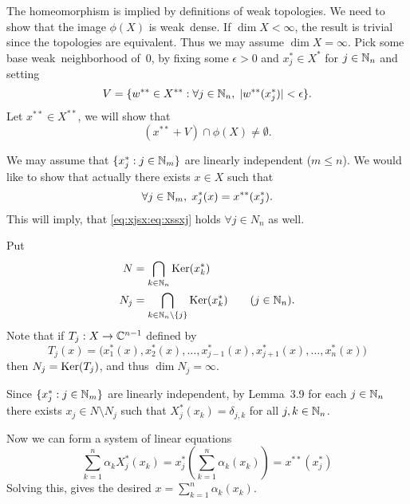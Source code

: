 \begin{enumerate}
\begin{itemize}
The homeomorphism is implied by definitions of weak topologies.
We need to show that the image \(\phi(X)\) is weak\upstar\ dense.
If \(\dim X < \infty\),
 the result is trivial since the topologies are equivalent.
Thus we may assume \(\dim X = \infty\).
Pick some base weak\upstar\ neighborhood of~0,
by fixing some \(\epsilon>0\) and \(x_j^*\in X^*\) for \(j\in\mathbb{N}_n\) and
setting
\begin{equation*}
V = \{w^{**}\in X^{**}: \forall j\in\mathbb{N}_n,\; |w^{**}(x_j^*)| < \epsilon\}.
\end{equation*}
Let \(x^{**}\in X^{**}\), we will show that
\begin{equation*}
(x^{**} + V) \cap \phi(X) \neq \emptyset.
\end{equation*}
\iffalse
We may assume that \(\{x_j^*:j\in\N_n\}\) are linearly independent,
since otherwise, we can take a linearly independent subset,
and the rest of the evaluations will be determined.
\fi
We may assume that \(\{x_j^*:j\in\mathbb{N}_m\}\) are linearly independent (\(m\leq n\)).
We would like to show that actually there exists \(x\in X\) such that
\begin{equation} \label{eq:xjsx:eq:xssxj}
\forall j\in\mathbb{N}_m,\; x_j^*(x) = x^{**}(x_j^*).
\end{equation}
This will imply, that \eqref{eq:xjsx:eq:xssxj} holds \(\forall j\in N_n\)
as well.

Put
\begin{align*}
N &= \bigcap_{k\in\mathbb{N}_n} \mathop{\rm Ker}\nolimits(x_k^*) \\
N_j &= \bigcap_{k\in\mathbb{N}_n\setminus\{j\}} \mathop{\rm Ker}\nolimits(x_k^*) \qquad (j\in\mathbb{N}_n).
\end{align*}
Note that if \(T_j:X \to \mathbb{C}^{n-1}\) defined by
\begin{equation*}
T_j(x) = 
 \bigl(
   x_1^*(x),x_2^*(x),\ldots,x_{j-1}^*(x),x_{j+1}^*(x),\ldots,x_n^*(x)
 \bigr)
\end{equation*}
then \(N_j = \mathop{\rm Ker}\nolimits(T_j)\), and thus \(\dim N_j = \infty\).

Since \(\{x_j^*:j\in\mathbb{N}_m\}\) are linearly independent, by Lemma~3.9
for each \(j\in\mathbb{N}_n\) there exists \(x_j \in N \setminus N_j\)
such that \(X_j^*(x_k) = \delta_{j,k}\) for all \(j,k\in\mathbb{N}_n\).

Now we can form a system of linear equations
\begin{equation*}
\sum_{k=1}^n \alpha_k X_j^*(x_k) 
  = x_j^*\left(\sum_{k=1}^n \alpha_k (x_k)\right) = x^{**}(x_j^*)
\end{equation*}
Solving this, gives the desired
\(x = \sum_{k=1}^n \alpha_k (x_k)\).


\end{itemize}
\end{enumerate}
